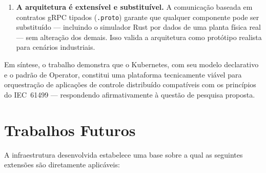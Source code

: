 \begin{enumerate}
  \item \textbf{A arquitetura é extensível e substituível.}
  A comunicação baseada em contratos gRPC tipados (\texttt{.proto}) garante que qualquer componente pode ser substituído — incluindo o simulador Rust por dados de uma planta física real — sem alteração dos demais. Isso valida a arquitetura como protótipo realista para cenários industriais.

\end{enumerate}

Em síntese, o trabalho demonstra que o Kubernetes, com seu modelo declarativo e o padrão de Operator, constitui uma plataforma tecnicamente viável para orquestração de aplicações de controle distribuído compatíveis com os princípios do IEC~61499 — respondendo afirmativamente à questão de pesquisa proposta.

\section{Trabalhos Futuros}
\label{sec:futuros}

A infraestrutura desenvolvida estabelece uma base sobre a qual as seguintes extensões são diretamente aplicáveis:

